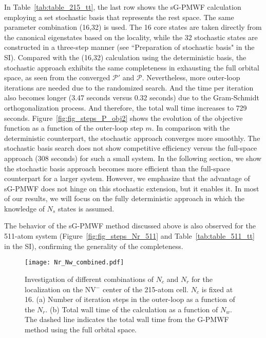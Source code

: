 \documentclass[journal=jacsat,manuscript=article]{achemso}
\begin{document}
In Table~\ref{tab:table_215_tt}, the last row shows the sG-PMWF calculation employing a set stochastic basis that represents the rest space. The same parameter combination (16,32) is used. The 16 core states are taken directly from the canonical eigenstates based on the locality, while the 32 stochastic states are constructed in a three-step manner (see ``Preparation of stochastic basis" in the SI). Compared with the (16,32) calculation using the deterministic basis, the stochastic approach exhibits the same completeness in exhausting the full orbital space, as seen from the converged $\mathcal{P}'$ and $\mathcal{P}$. Nevertheless, more outer-loop iterations are needed due to the randomized search. And the time per iteration also becomes longer (3.47 seconds versus 0.32 seconds) due to the Gram-Schmidt orthogonalization process. And therefore, the total wall time increases to 729 seconds. Figure~\ref{fig:fig_steps_P_obj2} shows the evolution of the objective function as a function of the outer-loop step $m$. In comparison with the deterministic counterpart, the stochastic approach converges more smoothly. The stochastic basis search does not show competitive efficiency versus the full-space approach (308 seconds) for such a small system. In the following section, we show the stochastic basis approach becomes more efficient than the full-space counterpart for a larger system. However, we emphasize that the advantage of sG-PMWF does not hinge on this stochastic extension, but it enables it. In most of our results, we will focus on the fully deterministic approach in which the knowledge of $N_s$ states is assumed.

The behavior of the sG-PMWF method discussed above is also observed for the 511-atom system (Figure~\ref{fig:fig_steps_Nr_511} and Table~\ref{tab:table_511_tt} in the SI), confirming the generality of the completeness.

\begin{figure}
    \centering
    \texttt{[image: Nr\_Nw\_combined.pdf]}
    \caption{Investigation of different combinations of $N_c$ and $N_r$ for the localization on the NV$^-$ center of the 215-atom cell. $N_c$ is fixed at 16. (a) Number of iteration steps in the outer-loop as a function of the $N_r$. (b) Total wall time of the calculation as a function of $N_w$. The dashed line indicates the total wall time from the G-PMWF method using the full orbital space.}
    \label{fig:fig_steps_Nr}
\end{figure}
\end{document}
